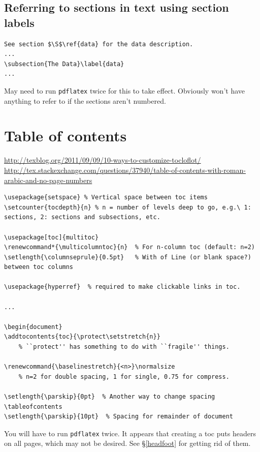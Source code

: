 \documentclass{article}
\begin{document}
\subsection{Referring to sections in text using section labels}
\begin{verbatim}
See section $\S$\ref{data} for the data description.
...
\subsection{The Data}\label{data}
...
\end{verbatim}
May need to run \texttt{pdflatex} twice for this to take effect.
Obviously won't have anything to refer to if the sections aren't numbered.

\newpage
\section{Table of contents}
\url{http://texblog.org/2011/09/09/10-ways-to-customize-tocloflot/}
\url{http://tex.stackexchange.com/questions/37940/table-of-contents-with-roman-arabic-and-no-page-numbers}


\begin{lstlisting}
\usepackage{setspace} % Vertical space between toc items
\setcounter{tocdepth}{n} % n = number of levels deep to go, e.g.\ 1: sections, 2: sections and subsections, etc.

\usepackage[toc]{multitoc}
\renewcommand*{\multicolumntoc}{n}  % For n-column toc (default: n=2)
\setlength{\columnseprule}{0.5pt}   % With of Line (or blank space?) between toc columns

\usepackage{hyperref}  % required to make clickable links in toc.

...

\begin{document}
\addtocontents{toc}{\protect\setstretch{n}}
    % ``protect'' has something to do with ``fragile'' things.

\renewcommand{\baselinestretch}{<n>}\normalsize
    % n=2 for double spacing, 1 for single, 0.75 for compress.

\setlength{\parskip}{0pt}  % Another way to change spacing
\tableofcontents
\setlength{\parskip}{10pt}  % Spacing for remainder of document
\end{lstlisting}

You will have to run \texttt{pdflatex} twice.
It appears that creating a toc puts headers on all pages, which may
not be desired. See \S{}\ref{headfoot} for getting rid of them.
\end{document}
